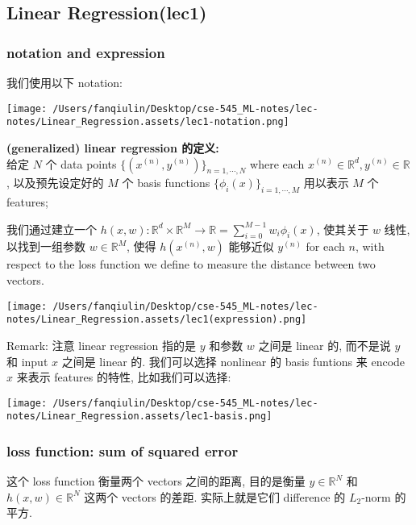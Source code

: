 \documentclass[
]{article}
\author{}
\date{}
\begin{document}
\hypertarget{linear-regressionlec1}{%
\subsection{Linear Regression(lec1)}\label{linear-regressionlec1}}

\hypertarget{notation-and-expression}{%
\subsubsection{notation and expression}\label{notation-and-expression}}

我们使用以下 notation:

\texttt{[image: /Users/fanqiulin/Desktop/cse-545\_ML-notes/lec-notes/Linear\_Regression.assets/lec1-notation.png]}

\textbf{(generalized) linear regression 的定义:}\\
给定 \(N\) 个 data points \(\{(x^{(n)},y^{(n)}) \}_{n=1,\cdots, N}\)
where each \(x^{(n)}\in\mathbb{R}^d,y^{(n)}  \in\mathbb{R}\),
以及预先设定好的 \(M\) 个 basis functions
\(\{ \phi_i(x)\}_{i=1,\cdots, M}\) 用以表示 \(M\) 个 features;

我们通过建立一个
\(h(x,w): \mathbb{R}^d \times \mathbb{R}^M \rightarrow  \mathbb{R} = \sum_{i=0}^{M-1} w_i \phi_i(x)\),
使其关于 \(w\) 线性, 以找到一组参数 \(w \in \mathbb{R}^M\), 使得
\(h(x^{(n)},w)\) 能够近似 \(y^{(n)}\) for each \(n\), with respect to
the loss function we define to measure the distance between two vectors.

\texttt{[image: /Users/fanqiulin/Desktop/cse-545\_ML-notes/lec-notes/Linear\_Regression.assets/lec1(expression).png]}

Remark: 注意 linear regression 指的是 \(y\) 和参数 \(w\) 之间是 linear
的, 而不是说 \(y\) 和 input \(x\) 之间是 linear 的. 我们可以选择
nonlinear 的 basis funtions 来 encode \(x\) 来表示 features 的特性,
比如我们可以选择:

\texttt{[image: /Users/fanqiulin/Desktop/cse-545\_ML-notes/lec-notes/Linear\_Regression.assets/lec1-basis.png]}

\hypertarget{loss-function-sum-of-squared-error}{%
\subsubsection{loss function: sum of squared
error}\label{loss-function-sum-of-squared-error}}

这个 loss function 衡量两个 vectors 之间的距离, 目的是衡量
\(y \in \mathbb{R}^N\) 和 \(h(x,w) \in \mathbb{R}^N\) 这两个 vectors
的差距. 实际上就是它们 difference 的 \(L_2\)-norm 的平方.
\end{document}
